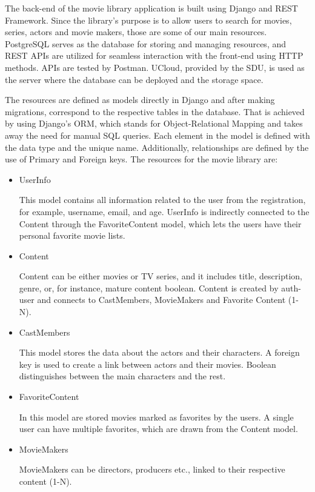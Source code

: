 \documentclass[letterpaper,twocolumn]{article}
\begin{document}
The back-end of the movie library application is built using Django and REST Framework. Since the library's purpose is to allow users to search for movies, series, actors and movie makers, those are some of our main resources. PostgreSQL serves as the database for storing and managing resources, and REST APIs are utilized for seamless interaction with the front-end using HTTP methods. APIs are tested by Postman. UCloud, provided by the SDU, is used as the server where the database can be deployed and the storage space. 

The resources are defined as models directly in Django and after making migrations, correspond to the respective tables in the database. That is achieved by using Django's ORM, which stands for Object-Relational Mapping and takes away the need for manual SQL queries. Each element in the model is defined with the data type and the unique name. Additionally, relationships are defined by the use of Primary and Foreign keys. The resources for the movie library are:

\begin{itemize}
    \item UserInfo
    
This model contains all information related to the user from the registration, for example, username, email, and age. UserInfo is indirectly connected to the Content through the FavoriteContent model, which lets the users have their personal favorite movie lists. 

    \item Content

Content can be either movies or TV series, and it includes title, description, genre, or, for instance, mature content boolean. Content is created by auth-user and connects to CastMembers, MovieMakers and Favorite Content (1-N).

    \item CastMembers

This model stores the data about the actors and their characters. A foreign key is used to create a link between actors and their movies. Boolean distinguishes between the main characters and the rest. 

    \item FavoriteContent

In this model are stored movies marked as favorites by the users. A single user can have multiple favorites, which are drawn from the Content model. 

    \item MovieMakers

MovieMakers can be directors, producers etc., linked to their respective content (1-N).
    
\end{itemize}
\end{document}
